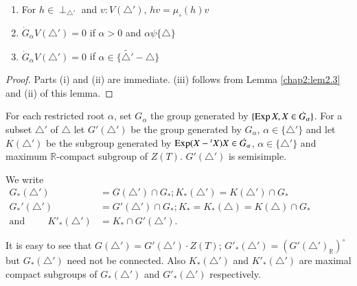 \begin{lemma} \label{chap2:lem2.7}
  \begin{enumerate}[\rm (i)]
    \item For $h \in \perp_{\triangle'}$ and $v: V (\triangle')$, $hv
      = \mu_\circ (h) v$
      \item $\dot{G}_\alpha V(\triangle')=0$ if $\alpha > 0$ and
        $\alpha \psi \{ \triangle\}$
        \item $\dot{G}_\alpha V (\triangle')=0$ if $\alpha \in \{ \widetilde{\triangle'}- 
          \triangle \} $ 
  \end{enumerate}
\end{lemma}

\begin{proof}
  Parts (i) and (ii) are immediate. (iii) follows from Lemma
  \ref{chap2:lem2.3} and (ii) of this lemma.
\end{proof}

For each restricted root $\alpha$, set $G_\alpha$ the group generated
by $\{ \operatorname{Exp} X, X \in \dot{G}_\alpha\}$. For a subset $\triangle'$ of
$\triangle$ let $G' (\triangle')$ be the group generated by
$G_\alpha$, $\alpha \in \{ \triangle' \}$ and let $K (\triangle')$ be
the subgroup generated by $\operatorname{Exp} (X- {}^tX) X \in \dot{G}_\alpha$,
$\alpha \in \{ \triangle'\}$ and maximum $\mathbb{R}$-compact subgroup
of $Z(T)$. $G'(\triangle')$ is semisimple.

We write
\begin{align*}
  G_* (\triangle') & = G (\triangle') \cap G_*; K_* (\triangle')=
  K(\triangle') \cap G_*\\
  G_*' (\triangle')& = G' (\triangle') \cap G_*; K_* = K_*
  (\triangle)= K(\triangle) \cap G_*\hspace{2cm}\\
  \text{and} \hspace{1cm} K'_* (\triangle') & = K_* \cap G'
  (\triangle'). 
\end{align*}

It is easy to see that $G(\triangle')= G' (\triangle')\cdot Z(T)$;
$G'_* (\triangle')= (G' (\triangle')_{\mathbb{R}})^\circ$ but
$G_*(\triangle')$ need not be connected. Also $K_* (\triangle')$ and
$K'_* (\triangle')$ are maximal compact subgroups of $G_*(\triangle')$
and $G'_*(\triangle')$ respectively.

